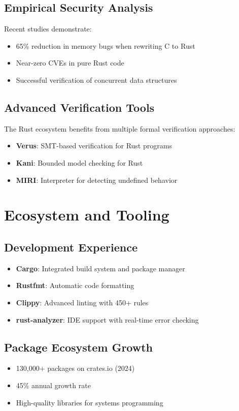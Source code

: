 \documentclass[11pt]{article}
\begin{document}
\subsection{Empirical Security Analysis}

Recent studies demonstrate:
\begin{itemize}
    \item 65\% reduction in memory bugs when rewriting C to Rust~\cite{acsac2022rust}
    \item Near-zero CVEs in pure Rust code~\cite{cveanalysis2023}
    \item Successful verification of concurrent data structures~\cite{verus2023}
\end{itemize}

\subsection{Advanced Verification Tools}

The Rust ecosystem benefits from multiple formal verification approaches:
\begin{itemize}
    \item \textbf{Verus}: SMT-based verification for Rust programs~\cite{verus2023}
    \item \textbf{Kani}: Bounded model checking for Rust
    \item \textbf{MIRI}: Interpreter for detecting undefined behavior
\end{itemize}

\section{Ecosystem and Tooling}

\subsection{Development Experience}
\begin{itemize}
    \item \textbf{Cargo}: Integrated build system and package manager
    \item \textbf{Rustfmt}: Automatic code formatting
    \item \textbf{Clippy}: Advanced linting with 450+ rules
    \item \textbf{rust-analyzer}: IDE support with real-time error checking
\end{itemize}

\subsection{Package Ecosystem Growth}
\begin{itemize}
    \item 130,000+ packages on crates.io (2024)
    \item 45\% annual growth rate
    \item High-quality libraries for systems programming
\end{itemize}
\end{document}
